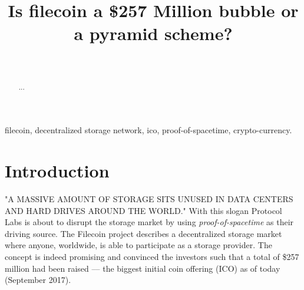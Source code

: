 \documentclass[journal]{IEEEtran}
\begin{document}
%
\title{Is filecoin a \$257 Million bubble or a pyramid scheme?}
%
%
%

\author{
 \\
}


\maketitle

\begin{abstract}

...

\end{abstract}

\begin{IEEEkeywords}
filecoin, decentralized storage network, ico, proof-of-spacetime, crypto-currency.
\end{IEEEkeywords}

\IEEEpeerreviewmaketitle

\section{Introduction}

"A MASSIVE AMOUNT OF STORAGE SITS UNUSED IN DATA CENTERS AND HARD DRIVES AROUND THE WORLD."
With this slogan Protocol Labs is about to disrupt the storage market by using \textit{proof-of-spacetime} as their driving source.
The Filecoin project describes a decentralized storage market where anyone, worldwide, is able to participate as a storage provider.
The concept is indeed promising and convinced the investors such that a total of \$257 million had been raised –-- the biggest initial coin offering (ICO) as of today (September 2017).
\end{document}
